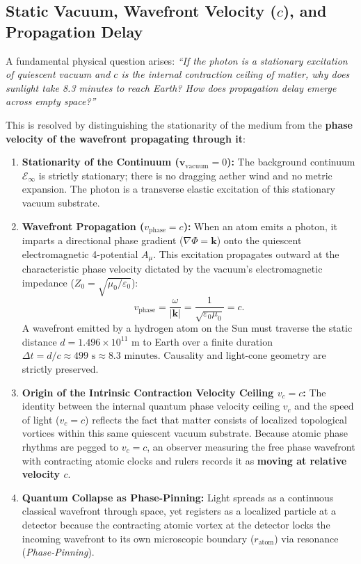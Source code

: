 \documentclass[11pt,a4paper]{article}
\begin{document}
\subsection{Static Vacuum, Wavefront Velocity (\texorpdfstring{$c$}{c}), and Propagation Delay}
\label{sec:kavramsal_netlik_isik}

A fundamental physical question arises: \textit{``If the photon is a stationary excitation of quiescent vacuum and $c$ is the internal contraction ceiling of matter, why does sunlight take 8.3 minutes to reach Earth? How does propagation delay emerge across empty space?''}

This is resolved by distinguishing the stationarity of the medium from the \textbf{phase velocity of the wavefront propagating through it}:

\begin{enumerate}
    \item \textbf{Stationarity of the Continuum ($\mathbf{v}_{\mathrm{vacuum}} = 0$):} The background continuum $\mathcal{E}_\infty$ is strictly stationary; there is no dragging aether wind and no metric expansion. The photon is a transverse elastic excitation of this stationary vacuum substrate.
    \item \textbf{Wavefront Propagation ($v_{\mathrm{phase}} = c$):} When an atom emits a photon, it imparts a directional phase gradient ($\nabla \Phi = \mathbf{k}$) onto the quiescent electromagnetic 4-potential $A_\mu$. This excitation propagates outward at the characteristic phase velocity dictated by the vacuum's electromagnetic impedance ($Z_0 = \sqrt{\mu_0/\varepsilon_0}$):
          \begin{equation}
              v_{\mathrm{phase}} = \frac{\omega}{|\mathbf{k}|} = \frac{1}{\sqrt{\varepsilon_0 \mu_0}} = c.
              \label{eq:faz_hizi_ispat}
          \end{equation}
          A wavefront emitted by a hydrogen atom on the Sun must traverse the static distance $d = 1.496 \times 10^{11}\text{ m}$ to Earth over a finite duration $\Delta t = d/c \approx 499\text{ s} \approx 8.3\text{ minutes}$. Causality and light-cone geometry are strictly preserved.
    \item \textbf{Origin of the Intrinsic Contraction Velocity Ceiling $v_c = c$:} The identity between the internal quantum phase velocity ceiling $v_c$ and the speed of light ($v_c = c$) reflects the fact that matter consists of localized topological vortices within this same quiescent vacuum substrate. Because atomic phase rhythms are pegged to $v_c = c$, an observer measuring the free phase wavefront with contracting atomic clocks and rulers records it as \textbf{moving at relative velocity $c$}.
    \item \textbf{Quantum Collapse as Phase-Pinning:} Light spreads as a continuous classical wavefront through space, yet registers as a localized particle at a detector because the contracting atomic vortex at the detector locks the incoming wavefront to its own microscopic boundary ($r_{\mathrm{atom}}$) via resonance (\textit{Phase-Pinning}).
\end{enumerate}
\end{document}
